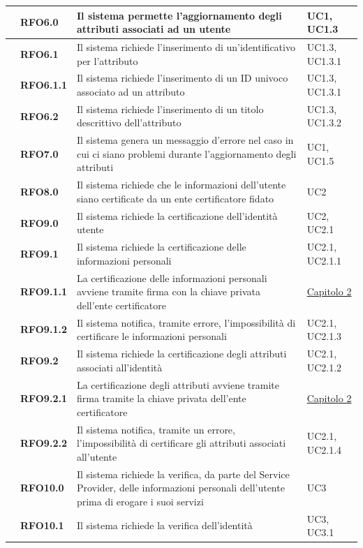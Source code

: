 \begin{longtable}{|r l|p{10cm}|p{2cm}|}
	&\textbf{RFO6.0}&Il sistema permette l'aggiornamento degli attributi associati ad un utente&UC1, UC1.3 \\\hline
	&\textbf{RFO6.1}&Il sistema richiede l'inserimento di un'identificativo per l'attributo&UC1.3, UC1.3.1 \\\hline
	&\textbf{RFO6.1.1}&Il sistema richiede l'inserimento di un ID univoco associato ad un attributo&UC1.3, UC1.3.1 \\\hline
	&\textbf{RFO6.2}&Il sistema richiede l'inserimento di un titolo descrittivo dell'attributo &UC1.3, UC1.3.2 \\\hline
	&\textbf{RFO7.0}&Il sistema genera un messaggio d'errore nel caso in cui ci siano problemi durante l'aggiornamento degli attributi&UC1, UC1.5 \\\hline
	&\textbf{RFO8.0}&Il sistema richiede che le informazioni dell'utente siano certificate da un ente certificatore fidato&UC2 \\\hline
	&\textbf{RFO9.0}&Il sistema richiede la certificazione dell'identità utente&UC2, UC2.1 \\\hline
	&\textbf{RFO9.1}&Il sistema richiede la certificazione delle informazioni personali&UC2.1, UC2.1.1 \\\hline
	&\textbf{RFO9.1.1}&La certificazione delle informazioni personali avviene tramite firma con la chiave privata dell'ente certificatore&\hyperref[cap:tecnologie_e_strumenti]{Capitolo 2} \\\hline
	&\textbf{RFO9.1.2}&Il sistema notifica, tramite errore, l'impossibilità di certificare le informazioni personali &UC2.1, UC2.1.3 \\\hline
	&\textbf{RFO9.2}&Il sistema richiede la certificazione degli attributi associati all'identità &UC2.1, UC2.1.2 \\\hline
	&\textbf{RFO9.2.1}&La certificazione degli attributi avviene tramite firma tramite la chiave privata dell'ente certificatore &\hyperref[cap:tecnologie_e_strumenti]{Capitolo 2} \\\hline
	&\textbf{RFO9.2.2}&Il sistema notifica, tramite un errore, l'impossibilità di certificare gli attributi associati all'utente &UC2.1, UC2.1.4 \\\hline
	&\textbf{RFO10.0}&Il sistema richiede la verifica, da parte del Service Provider, delle informazioni personali dell'utente prima di erogare i suoi servizi &UC3 \\\hline
	&\textbf{RFO10.1}&Il sistema richiede la verifica dell'identità &UC3, UC3.1 \\\hline

\end{longtable}
